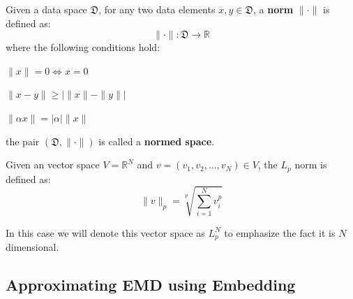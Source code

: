 \begin{definition}
Given a data space $\mathfrak{D}$, for any two data elements  $x,y \in \mathfrak{D}$, a \textbf{norm} $\|\cdot\|$ is defined as:
\begin{equation}
\|\cdot\|: \mathfrak{D} \longrightarrow \mathds{R}
\end{equation}
where the following conditions hold:
\begin{compactitem}
\item $\|x\|=0 \Leftrightarrow x=0$
\item $\|x-y\| \geq|\|x\|-\|y\||$
\item $\|\alpha x\|=|\alpha|\|x\|$
\end{compactitem}
the pair $\left(\mathfrak{D},\|\cdot\|\right)$ is called a \textbf{normed space}.
\label{def:norm}
\end{definition}


\begin{definition}
Given an vector space $V=\mathds{R}^N$ and $v=(v_1,v_2,...,v_N) \in V$, the $L_p$ norm is defined as:
\begin{equation}
\|v\|_p=\sqrt[p]{\sum\limits_{i=1}^N v_i^p}
\end{equation}
\label{lp}
\end{definition}
In this case we will denote this vector space as $L_p^N$ to emphasize the fact it is $N$ dimensional.

\subsection{Approximating EMD using Embedding}
\label{subsec:approximating_emd_using_embedding}

